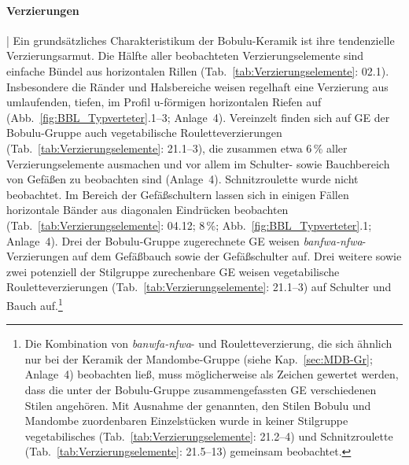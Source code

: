 \paragraph{Verzierungen}\hspace{-.5em}|\hspace{.5em}%
Ein grundsätzliches Charakteristikum der Bobulu-Keramik ist ihre tendenzielle Verzierungsarmut. Die Hälfte aller beobachteten Verzierungselemente sind einfache Bündel aus horizontalen Rillen (Tab.~\ref{tab:Verzierungselemente}: 02.1). Insbesondere die Ränder und Halsbereiche weisen regelhaft eine Verzierung aus umlaufenden, tiefen, im Profil u-förmigen horizontalen Riefen auf (Abb.~\ref{fig:BBL_Typverteter}.1--3; Anlage~4). Vereinzelt finden sich auf GE der Bobulu-Gruppe auch vegetabilische Rouletteverzierungen (Tab.~\ref{tab:Verzierungselemente}: 21.1--3), die zusammen etwa 6\,\% aller Verzierungselemente ausmachen und vor allem im Schulter- sowie Bauchbereich von Gefäßen zu beobachten sind (Anlage~4). Schnitzroulette wurde nicht beobachtet. Im Bereich der Gefäßschultern lassen sich in einigen Fällen horizontale Bänder aus diagonalen Eindrücken beobachten (Tab.~\ref{tab:Verzierungselemente}: 04.12; 8\,\%; Abb.~\ref{fig:BBL_Typverteter}.1; Anlage~4). Drei der Bobulu-Gruppe zugerechnete GE weisen \textit{banfwa-nfwa}-Verzierungen auf dem Gefäßbauch sowie der Gefäßschulter auf. Drei weitere sowie zwei potenziell der Stilgruppe zurechenbare GE weisen vegetabilische Rouletteverzierungen (Tab.~\ref{tab:Verzierungselemente}: 21.1--3) auf Schulter und Bauch auf.\footnote{Die Kombination von \textit{banwfa-nfwa}- und Rouletteverzierung, die sich ähnlich nur bei der Keramik der Mandombe-Gruppe (siehe Kap.~\ref{sec:MDB-Gr}; Anlage~4) beobachten ließ, muss möglicherweise als Zeichen gewertet werden, dass die unter der Bobulu-Gruppe zusammengefassten GE verschiedenen Stilen angehören. Mit Ausnahme der genannten, den Stilen Bobulu und Mandombe zuordenbaren Einzelstücken wurde in keiner Stilgruppe vegetabilisches (Tab.~\ref{tab:Verzierungselemente}: 21.2--4) und Schnitzroulette (Tab.~\ref{tab:Verzierungselemente}: 21.5--13) gemeinsam beobachtet.}

